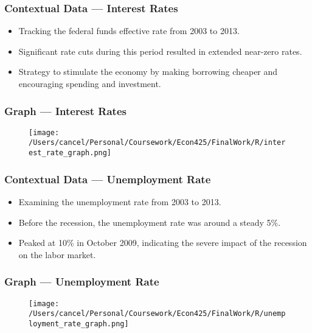 \documentclass{beamer}
\begin{document}
\begin{frame}
    \frametitle{Contextual Data --- Interest Rates}
    \begin{itemize}
        \item Tracking the federal funds effective rate from 2003 to 2013.
        \item Significant rate cuts during this period resulted in extended near-zero rates.
        \item Strategy to stimulate the economy by making borrowing cheaper and encouraging spending and investment.
    \end{itemize}
    
\end{frame}
\begin{frame}
    \frametitle{Graph --- Interest Rates}
\begin{figure}[h!]
        \centering
        \texttt{[image: /Users/cancel/Personal/Coursework/Econ425/FinalWork/R/interest\_rate\_graph.png]}
    \end{figure}
\end{frame}
\begin{frame}
    \frametitle{Contextual Data --- Unemployment Rate}
    \begin{itemize}
        \item Examining the unemployment rate from 2003 to 2013.
        \item Before the recession, the unemployment rate was around a steady 5\%.
        \item Peaked at 10\% in October 2009, indicating the severe impact of the recession on the labor market.
    \end{itemize}

\end{frame}
\begin{frame}
    \frametitle{Graph --- Unemployment Rate}
    \begin{figure}[h!]
        \centering
        \texttt{[image: /Users/cancel/Personal/Coursework/Econ425/FinalWork/R/unemployment\_rate\_graph.png]}
    \end{figure}
\end{frame}
\end{document}
